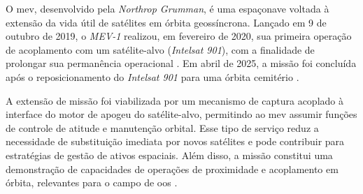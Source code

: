 O \gls{mev}, desenvolvido pela \emph{Northrop Grumman}, é uma espaçonave voltada à extensão da vida útil de satélites em órbita geossíncrona.
Lançado em 9 de outubro de 2019, o \emph{MEV-1} realizou, em fevereiro de 2020, sua primeira operação de acoplamento com um satélite-alvo (\emph{Intelsat 901}), com a finalidade de prolongar sua permanência operacional \cite{nytMEV1}.
Em abril de 2025, a missão foi concluída após o reposicionamento do \emph{Intelsat 901} para uma órbita cemitério \cite{intelsat901}.

A extensão de missão foi viabilizada por um mecanismo de captura acoplado à interface do motor de apogeu do satélite-alvo, permitindo ao \gls{mev} assumir funções de controle de atitude e manutenção orbital.
Esse tipo de serviço reduz a necessidade de substituição imediata por novos satélites e pode contribuir para estratégias de gestão de ativos espaciais.
Além disso, a missão constitui uma demonstração de capacidades de operações de proximidade e acoplamento em órbita, relevantes para o campo de \gls{oos} \cite{mev1}.
